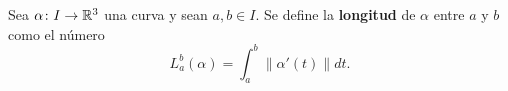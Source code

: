 %

\begin{definition}
	Sea $\alpha\colon I\to\mathbb{R}^3$ una curva y sean $a,b\in I$. Se define la
	\textbf{longitud} de $\alpha$ entre $a$ y $b$ como el número
	\[
		L_a^b(\alpha)=\int_a^b\|\alpha'(t)\|dt.
	\]
\end{definition}

